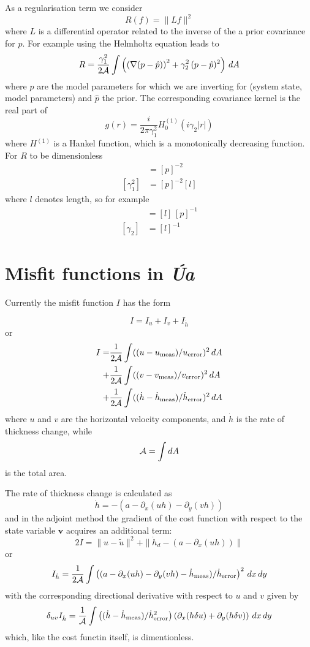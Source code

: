 \documentclass[10pt,a4paper]{book}
\newcommand{\p}{\partial}
\newcommand{\Ua}{\textsl{\'Ua}\,}
\begin{document}
As a regularisation term we consider
\[
 R(f)=\| L f \|^2
\]
where $L$ is a differential operator related to the inverse of the
a prior covariance for $p$. For example using the Helmholtz equation leads to
\begin{equation}
R=  \frac{\gamma_1^2}{2\cal{A}} \int \left (  \left ( \nabla( p - \hat{p}) \right )^2 + \gamma_2^2 \, (p-\hat{p})^2 \right ) \, dA
\label{eq:HR}
\end{equation}
where $p$ are the model parameters  for which we are inverting for (system state, model
parameters) and $\hat{p}$ the prior. The corresponding covariance kernel is
the real part of
\begin{equation}
g(r)= \frac{i}{2 \pi \gamma_1^2} H^{(1)}_0 (i \gamma_2 |r|)
\label{eq:HR2}
\end{equation}
where $H^{(1)}$ is a Hankel function, which is a monotonically
decreasing function. For $R$ to be dimensionless
\begin{align*}
[\gamma_1^2 \gamma_2^2] &= [p]^{-2} \\
[\gamma_1^2]&= [p]^{-2} [l]
\end{align*}
where $l$ denotes length, so for example
\begin{align*}
[\gamma_1]&=[l] \, [p]^{-1} \\
[\gamma_2]&=[l]^{-1} 
\end{align*}




\section{Misfit functions in \Ua}


Currently the misfit function $I$ has the form

\[
  I=I_u+I_v+I_{\dot{h}}
\]
or
\begin{align*}
I =&  \frac{1}{2\cal{A}} \int  ((u-u_{\mathrm{meas}})/u_{\mathrm{error}})^2 \, dA \\
   +&  \frac{1}{2\cal{A}} \int  ((v-v_{\mathrm{meas}})/v_{\mathrm{error}})^2 \, dA \\
   +& \frac{1}{2\cal{A}} \int  ((\dot{h} - \dot{h}_{\mathrm{meas}})/\dot{h}_{\mathrm{error}} )^2  \, dA \\
\end{align*}
where $u$ and $v$ are the horizontal velocity components, and
$\dot{h}$ is the rate of thickness change, while
\[
{\cal A}= \int dA
\]
is the total area.


The rate of thickness change is calculated as
\[
\dot{h}=- ( a - \p_x (uh) - \p_y (vh ))
\]
and in the adjoint method the gradient of the cost function with
respect to the state variable $\mathbf{v}$ acquires an additional
term:
\[
 2 I =\| u - \tilde{u} \|^2 +  \| \dot{h}_d - ( a - \p_x (uh) ) \|
\]
or
\[
I_{\dot{h}}= \frac{1}{2 {\cal A}} \int \left ( ( a - \p_x (uh) - \p_y (vh ) - \dot{h}_{\mathrm{meas}})/\dot{h}_{\mathrm{error}} \right )^2 \, dx \, dy
\]
with the corresponding directional derivative with respect to $u$ and $v$ given by
\[
\delta_{uv} I_{\dot{h}}= \frac{1}{{\cal A}} \int \left ((\dot{h}-\dot{h}_{\mathrm{meas}})/\dot{h}^2_{\mathrm{error}} \right )  \left ( \p_x ( h \delta u) + \p_y ( h \delta v) \right ) \, dx \, dy
\]
which, like the cost functin itself, is dimentionless.
\end{document}

